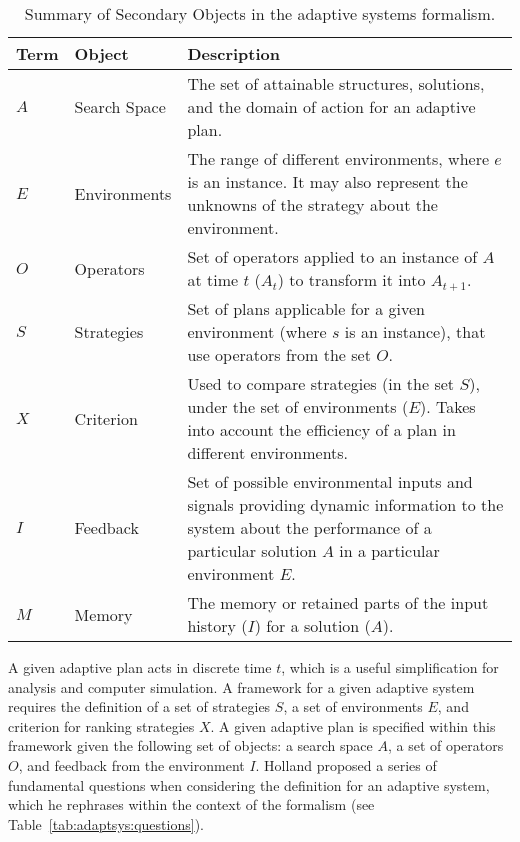 \begin{table}[ht]
	\centering\small
		\begin{tabularx}{\textwidth}{llX}
		\toprule
		\textbf{Term} & \textbf{Object} & \textbf{Description} \\ 
		\toprule
		$A$ & Search Space & The set of attainable structures, solutions, and the domain of action for an adaptive plan. \\ 
		\midrule
		$E$ & Environments & The range of different environments, where $e$ is an instance. It may also represent the unknowns of the strategy about the environment.  \\ 
		\midrule
		$O$ & Operators & Set of operators applied to an instance of $A$ at time $t$ ($A_t$) to transform it into $A_{t+1}$. \\ 
		\midrule
		$S$ & Strategies & Set of plans applicable for a given environment (where $s$ is an instance), that use operators from the set $O$.  \\ 
		\midrule
		$X$ & Criterion & Used to compare strategies (in the set $S$), under the set of environments ($E$). Takes into account the efficiency of a plan in different environments. \\ 
		\midrule
		$I$ & Feedback & Set of possible environmental inputs and signals providing dynamic information to the system about the performance of a particular solution $A$ in a particular environment $E$. \\ 
		\midrule
		$M$ & Memory & The memory or retained parts of the input history ($I$) for a solution ($A$). \\ 
		\bottomrule		
		\end{tabularx}	
	\caption{Summary of Secondary Objects in the adaptive systems formalism.}
	\label{tab:adaptsys:secondary}
\end{table}

A given adaptive plan acts in discrete time $t$, which is a useful simplification for analysis and computer simulation. A framework for a given adaptive system requires the definition of a set of strategies $S$, a set of environments $E$, and criterion for ranking strategies $X$. A given adaptive plan is specified within this framework given the following set of objects: a search space $A$, a set of operators $O$, and feedback from the environment $I$. Holland proposed a series of fundamental questions when considering the definition for an adaptive system, which he rephrases within the context of the formalism (see Table~\ref{tab:adaptsys:questions}).

